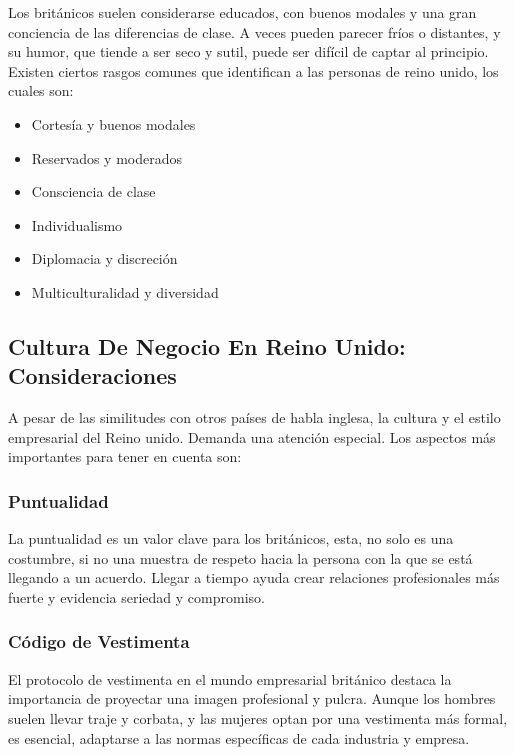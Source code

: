 \documentclass[letterpaper, 12pt]{article}
\begin{document}
Los británicos suelen considerarse educados, con buenos modales y una gran
conciencia de las diferencias de clase. A veces pueden parecer fríos o
distantes, y su humor, que tiende a ser seco y sutil, puede ser difícil de
captar al principio. Existen ciertos rasgos comunes que identifican a las
personas de reino unido, los cuales son:

\begin{itemize}[label=$\bullet$]
      \item Cortesía y buenos modales
      \item Reservados y moderados
      \item Consciencia de clase
      \item Individualismo
      \item Diplomacia y discreción
      \item Multiculturalidad y diversidad
\end{itemize}

\subsection*{Cultura De Negocio En Reino Unido: Consideraciones}

A pesar de las similitudes con otros países de habla inglesa, la cultura y el
estilo empresarial del Reino unido. Demanda una atención especial. Los aspectos
más importantes para tener en cuenta son:

\subsubsection*{Puntualidad}

La puntualidad es un valor clave para los británicos, esta, no solo es una
costumbre, si no una muestra de respeto hacia la persona con la que se está
llegando a un acuerdo. Llegar a tiempo ayuda crear relaciones profesionales más
fuerte y evidencia seriedad y compromiso.

\subsubsection*{Código de Vestimenta}

El protocolo de vestimenta en el mundo empresarial británico destaca la
importancia de proyectar una imagen profesional y pulcra. Aunque los hombres
suelen llevar traje y corbata, y las mujeres optan por una vestimenta más
formal, es esencial, adaptarse a las normas específicas de cada industria y
empresa.
\end{document}
